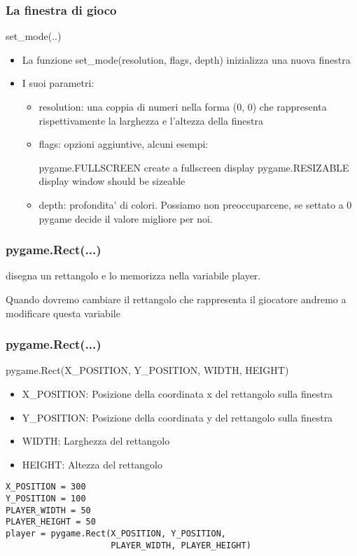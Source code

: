 \documentclass{beamer}
\begin{document}
\begin{frame}[fragile]
    \frametitle{La finestra di gioco}
    
    \begin{block}{set\_mode(..)}
        \begin{itemize}
            \item La funzione set\_mode(resolution, flags, depth) inizializza una nuova finestra
            \item I suoi parametri:
                
                \begin{itemize}
                    \item resolution: una coppia di numeri nella forma (0, 0) che rappresenta rispettivamente la larghezza e l'altezza della finestra
                    
                    \item flags: opzioni aggiuntive, alcuni esempi:
                    
                    pygame.FULLSCREEN    create a fullscreen display
                    pygame.RESIZABLE     display window should be sizeable

                    \item depth: profondita' di colori. Possiamo non preoccuparcene, se settato a 0 pygame decide il valore migliore per noi.
                \end{itemize}
        \end{itemize}
    \end{block}

\end{frame}

\begin{frame}[fragile]
    \frametitle{pygame.Rect(...)}
    disegna un rettangolo e lo memorizza nella variabile player.
    
    Quando dovremo cambiare il rettangolo che rappresenta il giocatore andremo a modificare questa variabile
\end{frame}    
    
\begin{frame}[fragile]
    \frametitle{pygame.Rect(...)}
    \begin{block}{pygame.Rect(X\_POSITION, Y\_POSITION, WIDTH, HEIGHT)}
        \begin{itemize}
            \item X\_POSITION: Posizione della coordinata x del rettangolo sulla finestra
            \item Y\_POSITION: Posizione della coordinata y del rettangolo sulla finestra
            \item WIDTH: Larghezza del rettangolo
            \item HEIGHT: Altezza del rettangolo
        \end{itemize}
    \end{block}
    \begin{lstlisting}
X_POSITION = 300
Y_POSITION = 100
PLAYER_WIDTH = 50
PLAYER_HEIGHT = 50
player = pygame.Rect(X_POSITION, Y_POSITION, 
                     PLAYER_WIDTH, PLAYER_HEIGHT)
    \end{lstlisting}
\end{frame}
\end{document}
